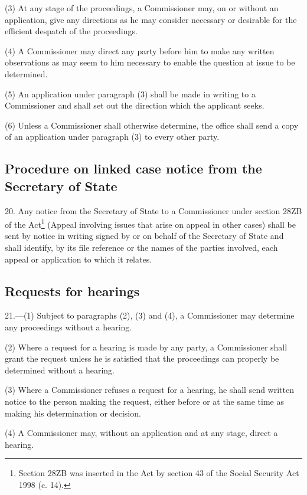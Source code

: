 \documentclass[12pt,a4paper]{article}
\begin{document}
(3) At any stage of the proceedings, a Commissioner may, on or without an application, give any directions as he may consider necessary or desirable for the efficient despatch of the proceedings.

(4) A Commissioner may direct any party before him to make any written observations as may seem to him necessary to enable the question at issue to be determined.

(5) An application under paragraph (3) shall be made in writing to a Commissioner and shall set out the direction which the applicant seeks.

(6) Unless a Commissioner shall otherwise determine, the office shall send a copy of an application under paragraph (3) to every other party.

\subsection[20. Procedure on linked case notice from the Secretary of State]{Procedure on linked case notice from the Secretary of State}

20.  Any notice from the Secretary of State to a Commissioner under section 28ZB of the Act\footnote{\frenchspacing Section 28ZB was inserted in the Act by section 43 of the Social Security Act 1998 (c. 14).} (Appeal involving issues that arise on appeal in other cases) shall be sent by notice in writing signed by or on behalf of the Secretary of State and shall identify, by its file reference or the names of the parties involved, each appeal or application to which it relates.

\subsection[21. Requests for hearings]{Requests for hearings}

21.—(1) Subject to paragraphs (2), (3) and (4), a Commissioner may determine any proceedings without a hearing.

(2) Where a request for a hearing is made by any party, a Commissioner shall grant the request unless he is satisfied that the proceedings can properly be determined without a hearing.

(3) Where a Commissioner refuses a request for a hearing, he shall send written notice to the person making the request, either before or at the same time as making his determination or decision.

(4) A Commissioner may, without an application and at any stage, direct a hearing.
\end{document}
